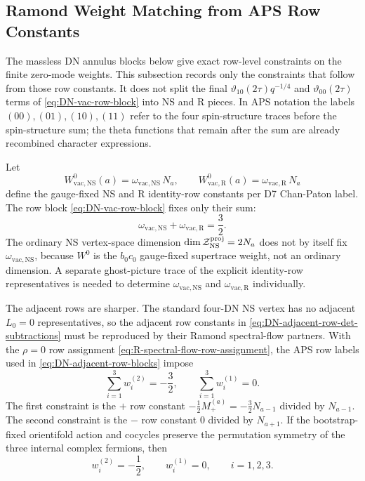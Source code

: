 \documentclass[11pt]{article}
\newcommand{\vac}{\mathrm{vac}}
\newcommand{\NS}{\mathrm{NS}}
\newcommand{\vart}{\vartheta}
\begin{document}
\subsection{Ramond Weight Matching from APS Row Constants}

The massless DN annulus blocks below give exact row-level constraints on the finite zero-mode
weights. This subsection records only the constraints that follow from those row constants. It
does not split the final \(\vart_{10}(2\tau)q^{-1/4}\) and \(\vart_{00}(2\tau)\) terms of
\eqref{eq:DN-vac-row-block} into NS and R pieces. In APS notation the labels
\((00),(01),(10),(11)\) refer to the four spin-structure traces before the spin-structure sum;
the theta functions that remain after the sum are already recombined character expressions.

Let
\begin{equation}
  W_{\vac,\NS}^{0}(a)=\omega_{\vac,\NS}\,N_a,
  \qquad
  W_{\vac,\mathrm R}^{0}(a)=\omega_{\vac,\mathrm R}\,N_a
  \label{eq:identity-row-NS-R-split}
\end{equation}
define the gauge-fixed NS and R identity-row constants per D7 Chan-Paton label. The row block
\eqref{eq:DN-vac-row-block} fixes only their sum:
\begin{equation}
  \omega_{\vac,\NS}+\omega_{\vac,\mathrm R}
  =
  \frac32 .
  \label{eq:APS-identity-row-sum-constraint}
\end{equation}
The ordinary NS vertex-space dimension
\(\dim\mathcal Z_{\NS}^{\rm proj}=2N_a\) does not by itself fix
\(\omega_{\vac,\NS}\), because \(W^0\) is the \(b_0c_0\) gauge-fixed supertrace weight, not an
ordinary dimension. A separate ghost-picture trace of the explicit identity-row representatives
is needed to determine \(\omega_{\vac,\NS}\) and \(\omega_{\vac,\mathrm R}\) individually.

The adjacent rows are sharper. The standard four-DN NS vertex has no adjacent \(L_0=0\)
representatives, so the adjacent row constants in
\eqref{eq:DN-adjacent-row-det-subtractions} must be reproduced by their Ramond spectral-flow
partners. With the \(\rho=0\) row assignment \eqref{eq:R-spectral-flow-row-assignment}, the APS
row labels used in \eqref{eq:DN-adjacent-row-blocks} impose
\begin{equation}
  \sum_{i=1}^{3}w_i^{(2)}=-\frac32,
  \qquad
  \sum_{i=1}^{3}w_i^{(1)}=0 .
  \label{eq:APS-adjacent-R-weight-constraints}
\end{equation}
The first constraint is the \(+\) row constant
\(-\frac12 M_+^{(a)}=-\frac32N_{a-1}\) divided by \(N_{a-1}\). The second constraint is the
\(-\) row constant \(0\) divided by \(N_{a+1}\). If the bootstrap-fixed orientifold action and
cocycles preserve the permutation symmetry of the three internal complex fermions, then
\begin{equation}
  w_i^{(2)}=-\frac12,
  \qquad
  w_i^{(1)}=0,
  \qquad i=1,2,3 .
  \label{eq:APS-adjacent-R-weight-permutation-solution}
\end{equation}
\end{document}
